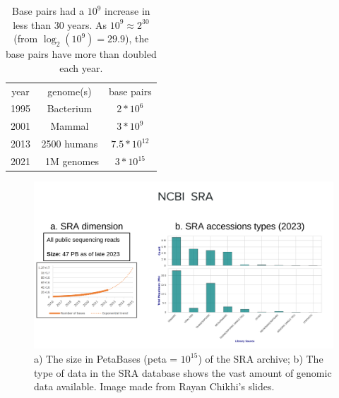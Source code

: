 \begin{table}[h!]
	\centering
	\begin{tabular}{c | c | c}
		year & genome(s) & base pairs \\
		1995 & Bacterium & $ 2*10^6$ \\
		2001 & Mammal & $ 3*10^9$ \\
		2013 & 2500 humans & $ 7.5*10^12$ \\
		2021 & ~1M genomes & $ 3*10^{15}$ \\
	\end{tabular}
	\caption[DNA data increase over the years.]{Base pairs had a $10^9$ increase in less than 30 years. As $10^9 \approx 2^{30}$ (from $ \log_2(10^9) = 29.9$), the base pairs have more than doubled each year\cite{durbin_recomb}.}
	\label{tab:bp-increase}
\end{table}
\begin{figure}[h!]
	\centering
	\includegraphics[width=\linewidth]{figures/background/sra.png}
	\caption[The Sequence Read Archive.]{a) The size in PetaBases (peta = $10^{15}$) of the SRA archive; b) The type of data in the SRA database shows the vast amount of genomic data available. Image made from Rayan Chikhi's slides.\\}
	\label{fig:SRA}
\end{figure}

